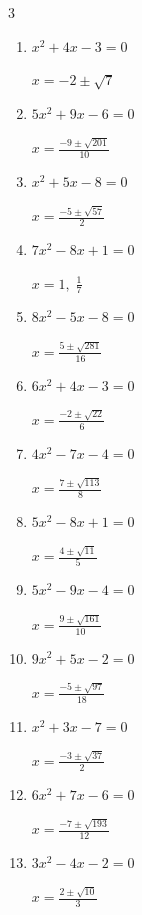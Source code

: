 \begin{multicols}{3}
\begin{enumerate}
  \item $x^{2}+4x-3=0$

        $\displaystyle x=-2\pm \sqrt{7}$

  \item $5x^{2}+9x-6=0$

        $\displaystyle x=\frac{-9\pm \sqrt{201}}{10}$

  \item $x^{2}+5x-8=0$

        $\displaystyle x=\frac{-5\pm \sqrt{57}}{2}$

  \item $7x^{2}-8x+1=0$

        $\displaystyle x=1, \; \frac{1}{7}$

  \item $8x^{2}-5x-8=0$

        $\displaystyle x=\frac{5\pm \sqrt{281}}{16}$

  \item $6x^{2}+4x-3=0$

        $\displaystyle x=\frac{-2\pm \sqrt{22}}{6}$

  \item $4x^{2}-7x-4=0$

        $\displaystyle x=\frac{7\pm \sqrt{113}}{8}$

\columnbreak %

  \item $5x^{2}-8x+1=0$

        $\displaystyle x=\frac{4\pm \sqrt{11}}{5}$

  \item $5x^{2}-9x-4=0$

        $\displaystyle x=\frac{9\pm \sqrt{161}}{10}$

  \item $9x^{2}+5x-2=0$

        $\displaystyle x=\frac{-5\pm \sqrt{97}}{18}$

  \item $x^{2}+3x-7=0$

        $\displaystyle x=\frac{-3\pm \sqrt{37}}{2}$

  \item $6x^{2}+7x-6=0$

        $\displaystyle x=\frac{-7\pm \sqrt{193}}{12}$

  \item $3x^{2}-4x-2=0$

        $\displaystyle x=\frac{2\pm \sqrt{10}}{3}$


\end{enumerate}
\end{multicols}
